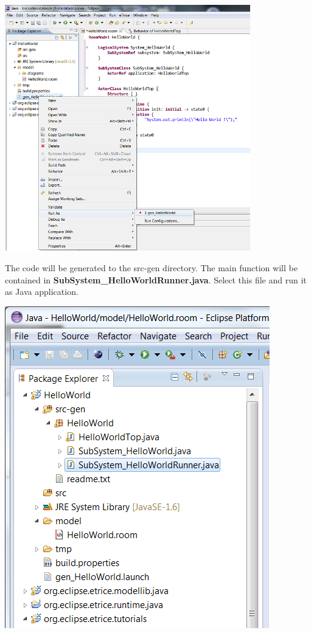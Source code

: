 \includegraphics[width=0.8\textwidth]{images/015-HelloWorld06.png}

The code will be generated to the src-gen directory. The main function will be contained in 
\textbf{SubSystem\_HelloWorldRunner.java}. Select this file and run it as Java application.

\includegraphics{images/015-HelloWorld07.png}


